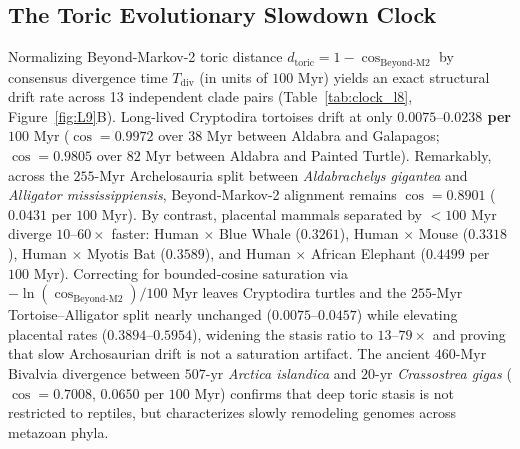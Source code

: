 \documentclass[11pt,a4paper]{article}
\renewcommand{\_}{\origunderscore\penalty200\relax}
\theoremstyle{remark}
\begin{document}
\subsection{The Toric Evolutionary Slowdown Clock}
Normalizing Beyond-Markov-2 toric distance $d_{\mathrm{toric}} = 1 - \cos_{\mathrm{Beyond\text{-}M2}}$ by consensus divergence time $T_{\mathrm{div}}$ (in units of $100\text{ Myr}$) yields an exact structural drift rate across 13 independent clade pairs (Table~\ref{tab:clock_l8}, Figure~\ref{fig:L9}B).
Long-lived Cryptodira tortoises drift at only \textbf{$0.0075\text{--}0.0238$ per $100\text{ Myr}$} ($\cos = 0.9972$ over $38\text{ Myr}$ between Aldabra and Galapagos; $\cos = 0.9805$ over $82\text{ Myr}$ between Aldabra and Painted Turtle).
Remarkably, across the $255\text{-Myr}$ Archelosauria split between \textit{Aldabrachelys gigantea} and \textit{Alligator mississippiensis}, Beyond-Markov-2 alignment remains $\cos = 0.8901$ ($0.0431$ per $100\text{ Myr}$).
By contrast, placental mammals separated by $<100\text{ Myr}$ diverge $10\text{--}60\times$ faster: Human $\times$ Blue Whale ($0.3261$), Human $\times$ Mouse ($0.3318$), Human $\times$ Myotis Bat ($0.3589$), and Human $\times$ African Elephant ($0.4499$ per $100\text{ Myr}$). Correcting for bounded-cosine saturation via $-\ln(\cos_{\mathrm{Beyond\text{-}M2}})/100\text{ Myr}$ leaves Cryptodira turtles and the $255\text{-Myr}$ Tortoise--Alligator split nearly unchanged ($0.0075\text{--}0.0457$) while elevating placental rates ($0.3894\text{--}0.5954$), widening the stasis ratio to $13\text{--}79\times$ and proving that slow Archosaurian drift is not a saturation artifact.
The ancient $460\text{-Myr}$ Bivalvia divergence between $507\text{-yr}$ \textit{Arctica islandica} and $20\text{-yr}$ \textit{Crassostrea gigas} ($\cos = 0.7008$, $0.0650$ per $100\text{ Myr}$) confirms that deep toric stasis is not restricted to reptiles, but characterizes slowly remodeling genomes across metazoan phyla.
\end{document}
